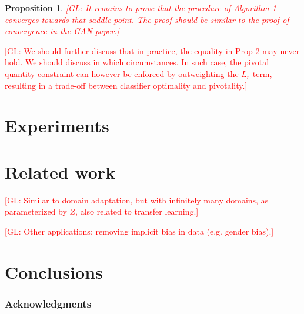 \documentclass{article}
\newcommand{\glnote}[1]{\textcolor{red}{[GL: #1]}}
\theoremstyle{plain}
\newtheorem{proposition}[theorem]{Proposition}
\begin{document}
\begin{proposition}
    \glnote{It remains to prove that the procedure of Algorithm 1
    converges towards that saddle point. The proof should be similar to the proof of convergence in the GAN paper.}
\end{proposition}

\glnote{We should further discuss that in practice, the equality in Prop 2 may never hold.
We should discuss in which circumstances. In such case, the pivotal quantity
constraint can however be enforced by outweighting the $L_r$ term, resulting in a
trade-off between classifier optimality and pivotality.}



\section{Experiments}



\section{Related work}

\glnote{Similar to domain adaptation, but with infinitely many domains,
as parameterized by $Z$, also related to transfer learning.}

\glnote{Other applications: removing implicit bias in data (e.g. gender bias).}



\section{Conclusions}



\subsubsection*{Acknowledgments}



\end{document}
